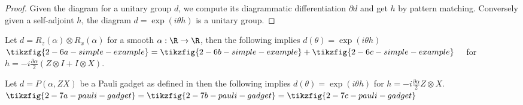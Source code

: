 \begin{proof}
Given the diagram for a unitary group $d$, we compute its diagrammatic
differentiation $\partial d$ and get $h$ by pattern matching.
Conversely given a self-adjoint $h$, the diagram $d = \exp(i \theta h)$
is a unitary group.
\end{proof}

\begin{example}
Let $d = R_z(\alpha) \otimes R_x(\alpha)$ for a smooth $\alpha : \R \to \R$,
then the following implies $d(\theta) = \exp(i \theta h)$\linebreak
$\tikzfig{2-6a-simple-example}
= \tikzfig{2-6b-simple-example}
+ \tikzfig{2-6c-simple-example} \quad$
for $h = - i \frac{\partial \alpha}{2}(Z \otimes I + I \otimes X)$.
\end{example}

\begin{example}
Let $d = P(\alpha, ZX)$ be a Pauli gadget as defined in \cite[def.~4.1]{CowtanEtAl20a} then
the following implies
$d(\theta) = \exp(i \theta h)$ for $h = -i \frac{\partial \alpha}{2} Z \otimes X$.
$\tikzfig{2-7a-pauli-gadget}
= \tikzfig{2-7b-pauli-gadget}
= \tikzfig{2-7c-pauli-gadget}$
\end{example}
